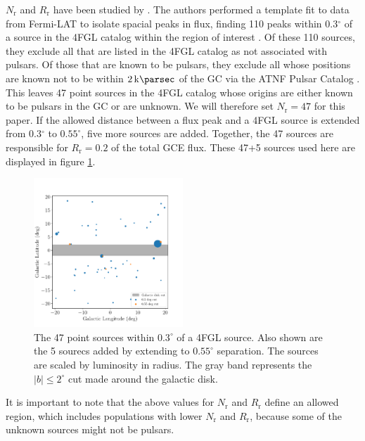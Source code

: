 \documentclass[a4paper,11pt]{article}
\newcommand{\comment}[1]{\emph{\color{red}{#1}}}
\begin{document}
$N_\text{r}$ and $R_\text{r}$ have been studied by \comment{Some technical name for the Fermilab team.} \cite{Zhong:2019ycb}. The authors performed a template fit to data from Fermi-LAT to isolate spacial peaks in flux, finding 110 \comment{(I got 110; their paper says 107)} peaks within 0.3$^\circ$ of a source in the 4FGL catalog within the region of interest \cite{Abdollahi_2020}. Of these 110 sources, they exclude all that are listed in the 4FGL catalog as not associated with pulsars. Of those that are known to be pulsars, they exclude all whose positions are known not to be within $\SI{2}{\kilo\parsec}$ of the GC via the ATNF Pulsar Catalog \cite{Hobbs04}. This leaves 47 point sources in the 4FGL catalog whose origins are either known to be pulsars in the GC or are unknown. We will therefore set $N_\text{r} = 47$ for this paper. If the allowed distance between a flux peak and a 4FGL source is extended from 0.3$^\circ$ to $0.55^\circ$, five more sources are added. Together, the 47 sources are responsible for $R_\text{r}=0.2$ of the total GCE flux. \comment{Shouldn't I actually redo this addition given the fact that I'm now not using the same GCE flux as Fermilab?} These 47+5 sources used here are displayed in figure \ref{fig:47-sources}.

\begin{figure}
    \centering
    \includegraphics[width=0.5\textwidth]{figs/point-source-positions.pdf}
    \caption{The 47 point sources within $0.3^\circ$ of a 4FGL source. Also shown are the 5 sourecs added by extending to $0.55^\circ$ separation. The sources are scaled by luminosity in radius. The gray band represents the $|b| \leq 2^\circ$ cut made around the galactic disk.}
    \label{fig:47-sources}
\end{figure}

It is important to note that the above values for $N_\text{r}$ and $R_\text{r}$ define an allowed region, which includes populations with lower $N_\text{r}$ and $R_\text{r}$, because some of the unknown sources might not be pulsars.
\end{document}
